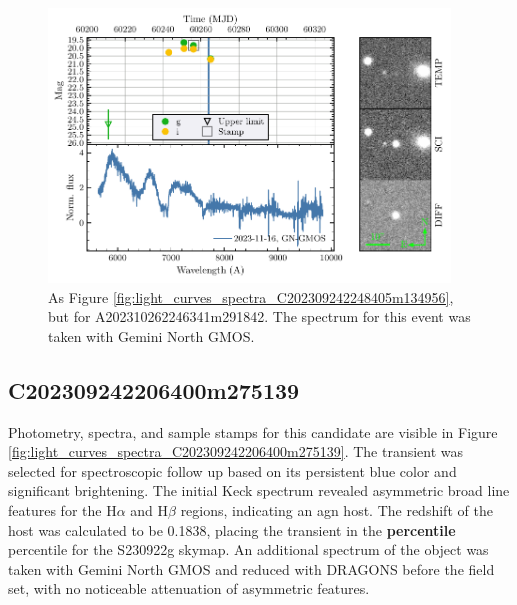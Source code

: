\documentclass[twocolumn]{aastex631}
\newcommand{\gweventid}{S230922g}
\newcommand{\todo}[1]{\textbf{\color{red} #1}}
\begin{document}
\begin{figure}
    \centering
    \includegraphics[width=0.95\textwidth]{figures/light_curves_spectra_7_A202310262246341m291842.pdf}
    \caption{
        As Figure \ref{fig:light_curves_spectra_C202309242248405m134956}, but for A202310262246341m291842.
        The spectrum for this event was taken with Gemini North GMOS.
    }
    \label{fig:light_curves_spectra_A202310262246341m291842}
\end{figure}


\subsection{C202309242206400m275139}

Photometry, spectra, and sample stamps for this candidate are visible in Figure \ref{fig:light_curves_spectra_C202309242206400m275139}.
The transient was selected for spectroscopic follow up based on its persistent blue color and significant brightening.
The initial Keck spectrum revealed asymmetric broad line features for the H$\alpha$ and H$\beta$ regions, indicating an \gls{agn} host.
The redshift of the host was calculated to be 0.1838, placing the transient in the \todo{percentile} percentile for the \gweventid{} skymap.
An additional spectrum of the object was taken with Gemini North GMOS and reduced with DRAGONS \citep{labrieDRAGONSDataReduction2019} before the field set, with no noticeable attenuation of asymmetric features.
\end{document}
